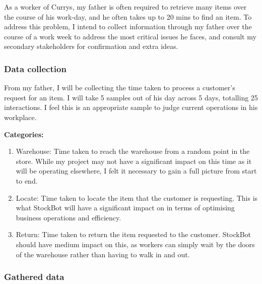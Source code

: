 As a worker of Currys, my father is often required to retrieve many items over the course of his work-day, and he often takes up to 20 mins to find an item. To address this problem, I intend to collect information through my father over the course of a work week to address the most critical issues he faces, and consult my secondary stakeholders for confirmation and extra ideas.

\newpage

\subsubsection{Data collection}

From my father, I will be collecting the time taken to process a customer's request for an item. I will take 5 samples out of his day across 5 days, totalling 25 interactions. I feel this is an appropriate sample to judge current operations in his workplace. \newline

\textbf{Categories:}

\begin{enumerate}
    \item Warehouse: Time taken to reach the warehouse from a random point in the store. While my project may not have a significant impact on this time as it will be operating elsewhere, I felt it necessary to gain a full picture from start to end.

    \item Locate: Time taken to locate the item that the customer is requesting. This is what StockBot will have a significant impact on in terms of optimising business operations and efficiency.

    \item Return: Time taken to return the item requested to the customer. StockBot should have medium impact on this, as workers can simply wait by the doors of the warehouse rather than having to walk in and out.
\end{enumerate}

\subsubsection{Gathered data}


